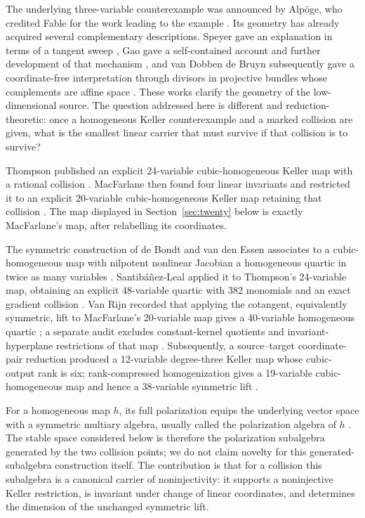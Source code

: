 \documentclass[11pt]{article}
\theoremstyle{remark}
\begin{document}
The underlying three-variable counterexample was announced by Alp\"oge, who credited Fable for the work leading to the example \citep{Alpoge2026}. Its geometry has already acquired several complementary descriptions. Speyer gave an explanation in terms of a tangent sweep \citep{Speyer2026}, Gao gave a self-contained account and further development of that mechanism \citep{Gao2026}, and van Dobben de Bruyn subsequently gave a coordinate-free interpretation through divisors in projective bundles whose complements are affine space \citep{vDdB2026}. These works clarify the geometry of the low-dimensional source. The question addressed here is different and reduction-theoretic: once a homogeneous Keller counterexample and a marked collision are given, what is the smallest linear carrier that must survive if that collision is to survive?

Thompson published an explicit 24-variable cubic-homogeneous Keller map with a rational collision \citep{Thompson2026}. MacFarlane then found four linear invariants and restricted it to an explicit 20-variable cubic-homogeneous Keller map retaining that collision \citep{MacFarlane2026}. The map displayed in Section~\ref{sec:twenty} below is exactly MacFarlane's map, after relabelling its coordinates.

The symmetric construction of de Bondt and van den Essen associates to a cubic-homogeneous map with nilpotent nonlinear Jacobian a homogeneous quartic in twice as many variables \citep{deBondtEssen2005a}. Santib\'a\~nez-Leal applied it to Thompson's 24-variable map, obtaining an explicit 48-variable quartic with 382 monomials and an exact gradient collision \citep{Santibanez2026}. Van Rijn recorded that applying the cotangent, equivalently symmetric, lift to MacFarlane's 20-variable map gives a 40-variable homogeneous quartic \citep{vanRijnStable2026}; a separate audit excludes constant-kernel quotients and invariant-hyperplane restrictions of that map \citep{vanRijnG20Audit2026}. Subsequently, a source--target coordinate-pair reduction produced a 12-variable degree-three Keller map whose cubic-output rank is six; rank-compressed homogenization gives a 19-variable cubic-homogeneous map and hence a 38-variable symmetric lift \citep{vanRijn12var2026}.

For a homogeneous map $h$, its full polarization equips the underlying vector space with a symmetric multiary algebra, usually called the polarization algebra of $h$ \citep{Umirbaev2019}. The stable space considered below is therefore the polarization subalgebra generated by the two collision points; we do not claim novelty for this generated-subalgebra construction itself. The contribution is that for a collision this subalgebra is a canonical carrier of noninjectivity: it supports a noninjective Keller restriction, is invariant under change of linear coordinates, and determines the dimension of the unchanged symmetric lift.
\end{document}
